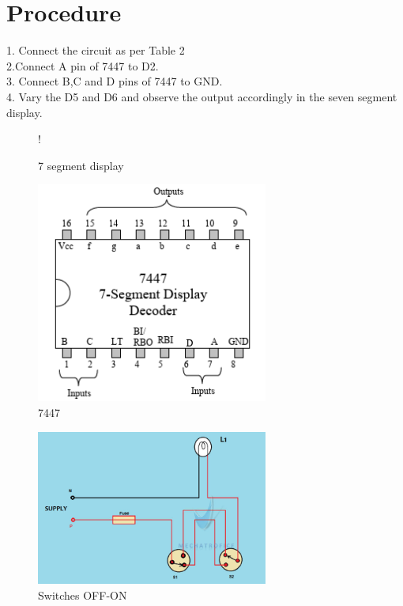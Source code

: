\documentclass[journal,12pt,twocolumn]{IEEEtran}
\begin{document}
\section{Procedure}

1. Connect the circuit as per Table 2\\
2.Connect A pin of 7447 to D2.\\
3. Connect B,C and D pins of 7447 to GND.\\
4. Vary the D5 and D6 and observe the output 
accordingly in the seven segment display.

\begin{figure}[!h]
\begin{center}
 {!} {
%

}
\end{center}
\caption{7 segment display}
\label{fig:sevenseg}
\end{figure}
\begin{figure}
    \centering
    \includegraphics[width=3in]{ic7447.png}
    \caption{7447}
    \label{fig:circuit}
\end{figure}
\begin{figure}
    \centering
    \includegraphics[width=3in]{xnor.jpeg}
    \caption{Switches OFF-ON}
    \label{fig:circuit}
\end{figure}
\end{document}
